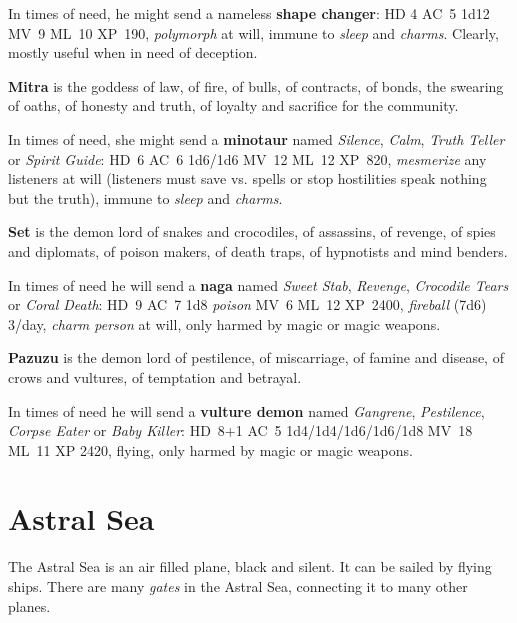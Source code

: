 \documentclass[11pt]{bxart}
\begin{document}
In times of need, he might send a nameless \textbf{shape changer}: HD
4 AC~5 1d12 MV~9 ML~10 XP~190, \textit{polymorph} at will, immune to
\textit{sleep} and \textit{charms}. Clearly, mostly useful when in
need of deception.

\textbf{Mitra} is the goddess of law, of fire, of bulls, of contracts,
of bonds, the swearing of oaths, of honesty and truth, of loyalty and
sacrifice for the community.

In times of need, she might send a \textbf{minotaur} named
\textit{Silence}, \textit{Calm}, \textit{Truth Teller} or
\textit{Spirit Guide}: HD~6 AC~6 1d6/1d6 MV~12 ML~12 XP~820,
\textit{mesmerize} any listeners at will (listeners must save vs.
spells or stop hostilities speak nothing but the truth), immune to
\textit{sleep} and \textit{charms}.

\textbf{Set} is the demon lord of snakes and crocodiles, of assassins,
of revenge, of spies and diplomats, of poison makers, of death traps,
of hypnotists and mind benders.

In times of need he will send a \textbf{naga} named \textit{Sweet
  Stab}, \textit{Revenge}, \textit{Crocodile Tears} or \textit{Coral
  Death}: HD~9 AC~7 1d8 \textit{poison} MV~6 ML~12 XP~2400,
\textit{fireball} (7d6) 3/day, \textit{charm person} at will, only
harmed by magic or magic weapons.

\textbf{Pazuzu} is the demon lord of pestilence, of miscarriage, of
famine and disease, of crows and vultures, of temptation and betrayal.

In times of need he will send a \textbf{vulture demon} named
\textit{Gangrene}, \textit{Pestilence}, \textit{Corpse Eater} or
\textit{Baby Killer}: HD~8+1 AC~5 1d4/1d4/1d6/1d6/1d8 MV~18 ML~11 XP
2420, flying, only harmed by magic or magic weapons.

\section{Astral Sea}

The Astral Sea is an air filled plane, black and silent. It can be
sailed by flying ships. There are many \textit{gates} in the Astral
Sea, connecting it to many other planes.
\end{document}
